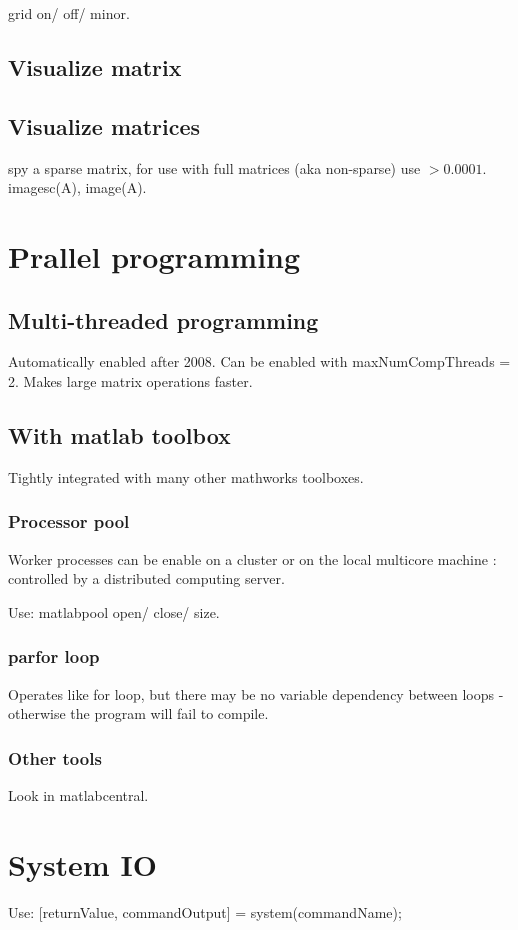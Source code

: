 \documentclass[oneside, article]{memoir}
\begin{document}
grid on/ off/ minor.

\subsection{Visualize matrix}
\subsection{Visualize matrices}
spy a sparse matrix, for use with full matrices (aka non-sparse) use $>0.0001$. imagesc(A), image(A).

\section{Prallel programming}
\subsection{Multi-threaded programming}
Automatically enabled after 2008. Can be enabled with maxNumCompThreads = 2. Makes large matrix operations faster.

\subsection{With matlab toolbox}
Tightly integrated with many other mathworks toolboxes.

\subsubsection{Processor pool}
Worker processes can be enable on a cluster or on the local multicore machine : controlled by a distributed computing server.

Use: matlabpool open/ close/ size.

\subsubsection{parfor loop}
Operates like for loop, but there may be no variable dependency between loops - otherwise the program will fail to compile.

\subsubsection{Other tools}
Look in matlabcentral.

\section{System IO}
Use: [returnValue, commandOutput] = system(commandName);
\end{document}
